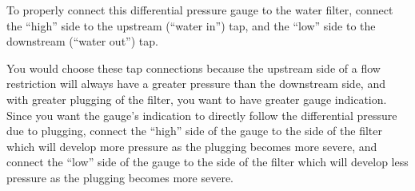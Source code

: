 







To properly connect this differential pressure gauge to the water filter, connect the ``high'' side to the upstream (``water in'') tap, and the ``low'' side to the downstream (``water out'') tap.

\vskip 10pt

You would choose these tap connections because the upstream side of a flow restriction will always have a greater pressure than the downstream side, and with greater plugging of the filter, you want to have greater gauge indication.  Since you want the gauge's indication to directly follow the differential pressure due to plugging, connect the ``high'' side of the gauge to the side of the filter which will develop more pressure as the plugging becomes more severe, and connect the ``low'' side of the gauge to the side of the filter which will develop less pressure as the plugging becomes more severe.




